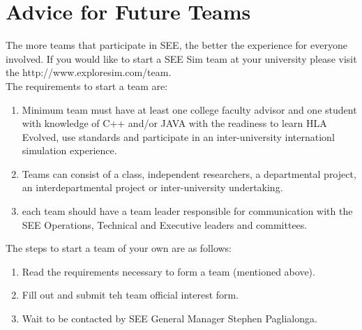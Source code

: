 \documentclass[journal, onecolumn]{IEEEtran}
\begin{document}
\section{Advice for Future Teams}
The more teams that participate in SEE, the better the experience for everyone involved.  If you would like to start a SEE Sim team at your university please visit the http://www.exploresim.com/team.\\
The requirements to start a team are:
\begin{enumerate}
	\item Minimum team must have at least one college faculty advisor and one student with knowledge of C++ and/or JAVA with the readiness to learn HLA 	 		Evolved, use standards and participate in an inter-university internationl simulation experience.  
	\item Teams can consist of a class, independent researchers, a departmental project, an interdepartmental project or inter-university undertaking.
	\item each team should have a team leader responsible for communication with the SEE Operations, Technical and Executive leaders and committees.
\end{enumerate}

The steps to start a team of your own are as follows:
\begin{enumerate}
	\item Read the requirements necessary to form a team (mentioned above).
	\item Fill out and submit teh team official interest form.
	\item Wait to be contacted by SEE General Manager Stephen Paglialonga.
\end{enumerate}
\end{document}
